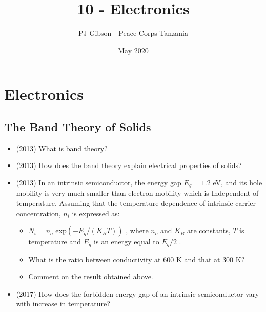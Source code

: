\documentclass{article}
\title{\textbf{10 - Electronics}}
\author{PJ Gibson - Peace Corps Tanzania}
\date{May 2020}
\newcommand{\mysection}[2]{\setcounter{section}{#1}\addtocounter{section}{-1}\section{#2}}
\begin{document}
\maketitle


\mysection{10}{Electronics}

\subsection{The Band Theory of Solids}
\begin{itemize}
\item (2013)  What is band theory?
\item (2013)  How does the band theory explain electrical properties of solids?
\item (2013)  In an intrinsic semiconductor, the energy gap $ E_{g}=1.2$ eV, and its hole mobility is very much smaller than electron mobility which is Independent of temperature. Assuming that the temperature dependence of intrinsic carrier concentration, $ n_{i}$ is expressed as:
 \begin{itemize}
\item $ N_{i}=n_{o}$ exp$ (-E_{g}/(K_{B}T))$ , where $ n_{o}$ and $ K_{B}$ are constants, $ T$ is temperature and $ E_{g}$ is an energy equal to $ E_{q}/2$ .  
\item What is the ratio between conductivity at $ 600$ K and that at $ 300$ K?
\item Comment on the result obtained above.
\end{itemize}
\item (2017)  How does the forbidden energy gap of an intrinsic semiconductor vary with increase in temperature? 
\end{itemize}
\end{document}
